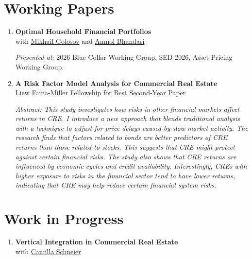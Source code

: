 \documentclass[11pt,letterpaper]{article}
\newenvironment{sectionbody}{%
  \begin{list}{}{\setlength{\leftmargin}{0.18in}\setlength{\rightmargin}{0pt}%
    \setlength{\topsep}{0pt}\setlength{\partopsep}{0pt}%
    \setlength{\parsep}{3pt}\setlength{\itemsep}{0pt}}\item[]%
}{\end{list}}
\newcommand{\paperabstract}[1]{\par\begingroup\small\itshape Abstract: #1\par\endgroup}
\begin{document}
\section*{Working Papers}
\begin{sectionbody}
  \begin{enumerate}
    \item \textbf{Optimal Household Financial Portfolios}\\
      with \href{https://voices.uchicago.edu/golosov/}{Mikhail Golosov}
      and \href{https://www.bhandarianmol.com/}{Anmol Bhandari}
      \par {\small \textit{Presented at:} 2026 Blue Collar Working Group,
      SED 2026, Asset Pricing Working Group.\par}

    \item \textbf{A Risk Factor Model Analysis for Commercial Real Estate}\\
      Liew Fama-Miller Fellowship for Best Second-Year Paper
      \paperabstract{This study investigates how risks in other financial markets
      affect returns in CRE. I introduce a new approach that blends traditional
      analysis with a technique to adjust for price delays caused by slow market
      activity. The research finds that factors related to bonds are better
      predictors of CRE returns than those related to stocks. This suggests that
      CRE might protect against certain financial risks. The study also shows
      that CRE returns are influenced by economic cycles and credit availability.
      Interestingly, CREs with higher exposure to risks in the financial sector
      tend to have lower returns, indicating that CRE may help reduce certain
      financial system risks.}
  \end{enumerate}
\end{sectionbody}

\section*{Work in Progress}
\begin{sectionbody}
  \begin{enumerate}
    \item \textbf{Vertical Integration in Commercial Real Estate}\\
      with \href{https://camillaschneier.github.io/}{Camilla Schneier}
  \end{enumerate}
\end{sectionbody}
\end{document}

